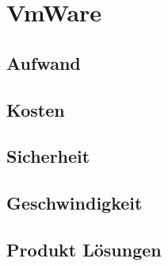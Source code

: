 \section{VmWare}
\subsection{Aufwand}

\subsection{Kosten}

\subsection{Sicherheit}

\subsection{Geschwindigkeit}

\subsection{Produkt Lösungen}





